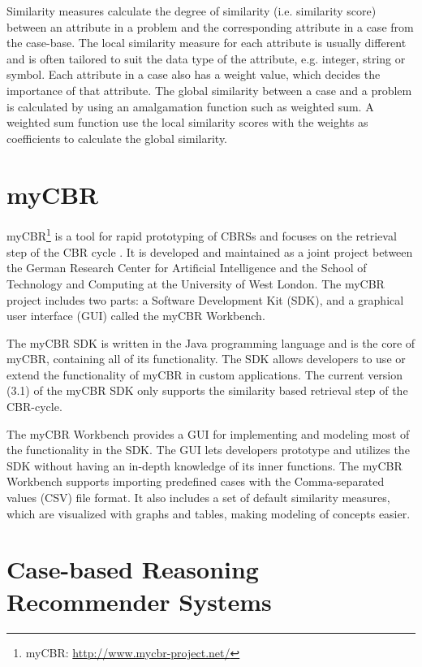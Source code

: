 Similarity measures calculate the degree of similarity (i.e. similarity score) between an attribute in a problem and the corresponding attribute in a case from the case-base. The local similarity measure for each attribute is usually different and is often tailored to suit the data type of the attribute, e.g. integer, string or symbol. Each attribute in a case also has a weight value, which decides the importance of that attribute. The global similarity between a case and a problem is calculated by using an amalgamation function such as weighted sum. A weighted sum function use the local similarity scores with the weights as coefficients to calculate the global similarity.

\section{myCBR}

myCBR\footnote{myCBR: \url{http://www.mycbr-project.net/}} is a tool for rapid prototyping of CBRSs and focuses on the retrieval step of the CBR cycle \cite{Stahl2008}. It is developed and maintained as a joint project between the German Research Center for Artificial Intelligence and the School of Technology and Computing at the University of West London. The myCBR project includes two parts: a Software Development Kit (SDK), and a graphical user interface (GUI) called the myCBR Workbench.

The myCBR SDK is written in the Java programming language and is the core of myCBR, containing all of its functionality. The SDK allows developers to use or extend the functionality of myCBR in custom applications. The current version (3.1) of the myCBR SDK only supports the similarity based retrieval step of the CBR-cycle.

The myCBR Workbench provides a GUI for implementing and modeling most of the functionality in the SDK. The GUI lets developers prototype and utilizes the SDK without having an in-depth knowledge of its inner functions. The myCBR Workbench supports importing predefined cases with the Comma-separated values (CSV) file format. It also includes a set of default similarity measures, which are visualized with graphs and tables, making modeling of concepts easier.

\section{Case-based Reasoning Recommender Systems}\label{sec:case_based_recommender_systems}

